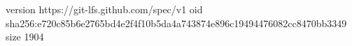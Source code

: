 version https://git-lfs.github.com/spec/v1
oid sha256:e720c85b6e2765bd4e2f4f10b5da4a743874e896c19494476082cc8470bb3349
size 1904

